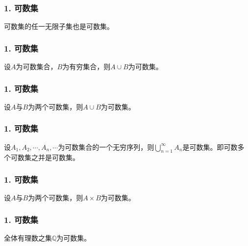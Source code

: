 \documentclass{beamer}
\begin{document}
\begin{CJK*}{UTF8}{gbsn}
\begin{frame}[t]
  \frametitle{1. 可数集}
  \begin{Thm}
    可数集的任一无限子集也是可数集。
  \end{Thm}
\end{frame}
\begin{frame}[t]
  \frametitle{1. 可数集}
  \begin{Thm}
   设$A$为可数集合，$B$为有穷集合，则$A\cup B$为可数集。
  \end{Thm}
\end{frame}

\begin{frame}[t]
  \frametitle{1. 可数集}
  \begin{Thm}
    设$A$与$B$为两个可数集，则$A\cup B$为可数集。
  \end{Thm}
\end{frame}

\begin{frame}[t]
  \frametitle{1. 可数集}
  \begin{Thm}
    设$A_1, A_2, \cdots, A_n, \cdots$为可数集合的一个无穷序列，则$\bigcup_{n=1}^{\infty}A_n$是可数集。即可数多个可数集之并是可数集。
  \end{Thm}
\end{frame}

\begin{frame}[t]
  \frametitle{1. 可数集}
  \begin{Thm}
    设$A$与$B$为两个可数集，则$A\times B$为可数集。
  \end{Thm}
\end{frame}

\begin{frame}[t]
  \frametitle{1. 可数集}
  \begin{Thm}
    全体有理数之集$\mathbb{Q}$为可数集。
  \end{Thm}
\end{frame}



\end{CJK*}
\end{document}
